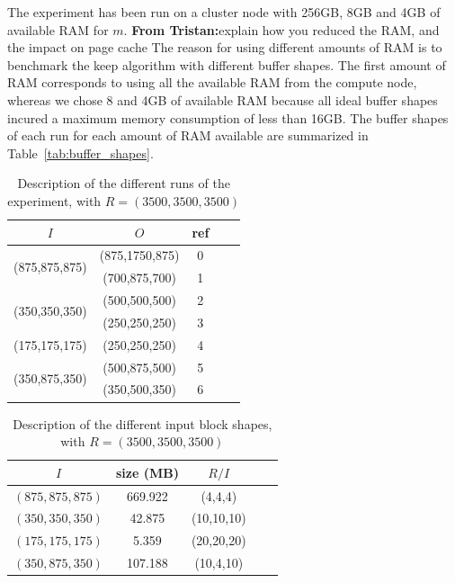 \documentclass[sigconf, nonacm]{acmart}
\newcommand{\tristan}[1]{\color{orange}\textbf{From Tristan:}#1\color{black}}
\begin{document}
The experiment has been run on a cluster node with 256GB, 8GB and 4GB of
available RAM for $m$. \tristan{explain how you reduced the RAM, and the impact on page cache}
The reason for using different amounts of RAM is to benchmark the keep algorithm
with different buffer shapes.
The first amount of RAM corresponds to using all the
available RAM from the compute node, whereas we chose 8 and 4GB of available RAM
because all ideal buffer shapes incured a maximum memory consumption of less than
16GB.
The buffer shapes of each run for each amount of RAM available are summarized in
Table~\ref{tab:buffer_shapes}.

\begin{table}[ht]
  \centering
  \caption{Description of the different runs of the experiment, with $R=(3500,3500,3500)$}

   \begin{tabular}[t]{| c | c | c | c | c |}
   \hline
   $I$ & $O$ & ref \\
   \hline
   \multirow{2}{*}{(875,875,875)} & (875,1750,875) & 0 \\
   & (700,875,700) & 1 \\
   \hline
   \multirow{2}{*}{(350,350,350)} & (500,500,500) & 2 \\
   & (250,250,250) & 3 \\
   \hline
   \multirow{1}{*}{(175,175,175)} & (250,250,250) & 4 \\
   \hline
   \multirow{2}{*}{(350,875,350)} & (500,875,500) & 5 \\
   & (350,500,350) & 6 \\
   \hline
   \end{tabular}

   \label{tab:exp}

\end{table}

\begin{table}[ht]
  \centering
  \caption{Description of the different input block shapes, with $R=(3500,3500,3500)$}

   \begin{tabular}[t]{| c | c | c | c | c |}
   \hline
   $I$ & size (MB) & $R/I$ \\
   \hline
   $(875,875,875)$ & 669.922 & (4,4,4) \\
   \hline
   $(350,350,350)$ & 42.875 & (10,10,10) \\
   \hline
   $(175,175,175)$ & 5.359 & (20,20,20) \\
   \hline
   $(350,875,350)$ & 107.188 & (10,4,10) \\
   \hline
   \end{tabular}

   \label{tab:exp_inblocks}

\end{table}
\end{document}
